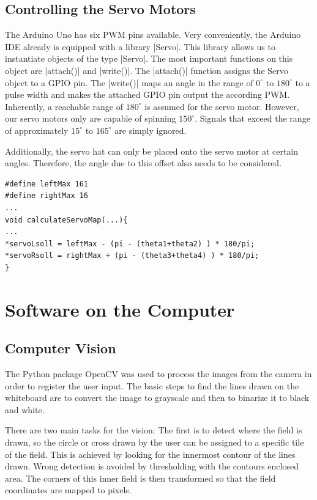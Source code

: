 \documentclass{sig-alternate-05-2015}
\begin{document}
\subsection{Controlling the Servo Motors}
The Arduino Uno has six PWM pins available. Very conveniently, the Arduino IDE already is equipped with a library |Servo|. This library allows us to instantiate objects of the type |Servo|. The most important functions on this object are |attach()| and |write()|. The |attach()| function assigns the Servo object to a GPIO pin. The |write()| maps an angle in the range of $0^\circ$ to $180^\circ$ to a pulse width and makes the attached GPIO pin output the according PWM. Inherently, a reachable range of $180^\circ$ is assumed for the servo motor. However, our servo motors only are capable of spinning $150^\circ$. Signals that exceed the range of approximately $15^\circ$ to $165^\circ$ are simply ignored.

Additionally, the servo hat can only be placed onto the servo motor at certain angles. Therefore, the angle due to this offset also needs to be considered. 
\begin{lstlisting}[caption = Finding the right angle]
#define leftMax 161
#define rightMax 16
...
void calculateServoMap(...){
...
*servoLsoll = leftMax - (pi - (theta1+theta2) ) * 180/pi; 
*servoRsoll = rightMax + (pi - (theta3+theta4) ) * 180/pi;
}
\end{lstlisting}

\section{Software on the Computer}
\subsection{Computer Vision}
The Python package OpenCV \cite{CV} was used to process the images from the camera in order to register the user input. The basic steps to find the lines drawn on the whiteboard are to convert the image to grayscale and then to binarize it to black and white. 

There are two main tasks for the vision: The first is to detect where the field is drawn, so the circle or cross drawn by the user can be assigned to a specific tile of the field. This is achieved by looking for the innermost contour of the lines drawn. Wrong detection is avoided by thresholding with the contours enclosed area. The corners of this inner field is then transformed so that the field coordinates are mapped to pixels.
\end{document}
